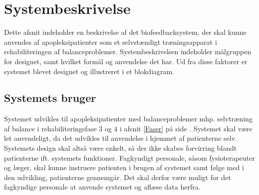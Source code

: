 \section{Systembeskrivelse} 
Dette afsnit indeholder en beskrivelse af det biofeedbacksystem, der skal kunne anvendes af apopleksipatienter som et selvstændigt træningsapparat i rehabiliteringen af balanceproblemer. Systembeskrivelsen indeholder målgruppen for designet, samt hvilket formål og anvendelse det har. Ud fra disse faktorer er systemet blevet designet og illustreret i et blokdiagram. 

\subsection{Systemets bruger}
Systemet udvikles til apopleksipatienter med balanceproblemer mhp. selvtræning af balance i rehabiliteringsfase $3$ og $4$ i afsnit \ref{Faser} på side \pageref{Faser}. Systemet skal være let anvendeligt, da det udvikles til anvendelse i hjemmet af patienterne selv. Systemets design skal altså være enkelt, så der ikke skabes forvirring blandt patienterne ift. systemets funktioner. Fagkyndigt personale, såsom fysioterapeuter og læger, skal kunne instruere patienten i brugen af systemet samt følge med i den udvikling, patienterne gennemgår. Det skal derfor være muligt for det fagkyndige personale at anvende systemet og aflæse data herfra. 

